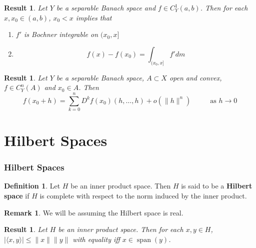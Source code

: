 \documentclass[notheorems]{beamer}
\newtheorem{res}[thm]{Result}
\theoremstyle{definition}
\newtheorem{defn}[definition]{Definition}
\theoremstyle{definition}
\newtheorem{rem}[definition]{Remark}
\renewcommand{\r}{\rangle}
\renewcommand{\l}{\langle}
\DeclareMathOperator{\spn}{span}
\begin{document}
\begin{frame}
\begin{res}
Let $Y$ be a separable Banach space and $f \in C^1_Y(a,b)$. Then for each $x, x_0 \in (a,b)$, $x_0 < x$ implies that 
	\begin{enumerate}
	\item $f'$ is Bochner integrable on $(x_0, x]$ 
	\item  $$f(x) - f(x_0) = \int_{(x_0, x]}f'dm$$ 
	\end{enumerate}
\end{res}
\pause

\begin{res}
Let $Y$ be a separable Banach space, $A \subset X$ open and convex, $f\in C^n_Y(A)$ and $x_0 \in A$. Then $$f(x_0 + h) = \sum_{k=0}^n D^k f(x_0)(h, \dots, h) + o(\|h\|^n) \hspace{1cm }\text{ as } h \rightarrow 0$$
\end{res}
\end{frame}










\section{Hilbert Spaces}
\begin{frame}
\frametitle{Hilbert Spaces}


\begin{defn}
Let $H$ be an inner product space. Then $H$ is said to be a \textbf{Hilbert space} if $H$ is complete with respect to the norm induced by the inner product.
\end{defn}
\pause

\begin{rem}
We will be assuming the Hilbert space is real. 
\end{rem}
\pause

\begin{res}
Let $H$ be an inner product space. Then for each $x,y \in H$, $|\l x, y\r| \leq \|x\| \|y\|$ with equality iff $x \in \spn(y)$.
\end{res}
\end{frame}
\end{document}

